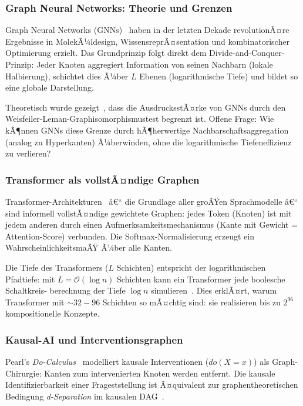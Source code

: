 ﻿\documentclass[12pt,a4paper,twoside]{article}
\theoremstyle{definition}
\theoremstyle{plain}
\theoremstyle{remark}
\begin{document}
\subsubsection{Graph Neural Networks: Theorie und Grenzen}

Graph Neural Networks (GNNs)~\cite{Kipf2017, Velickovic2018}
haben in der letzten Dekade revolutionÃ¤re Ergebnisse in
MolekÃ¼ldesign, WissensreprÃ¤sentation und kombinatorischer
Optimierung erzielt.  Das Grundprinzip folgt direkt dem
Divide-and-Conquer-Prinzip:  Jeder Knoten aggregiert
Information von seinen Nachbarn (lokale Halbierung),
schichtet dies Ã¼ber $L$ Ebenen (logarithmische Tiefe)
und bildet so eine globale Darstellung.

Theoretisch wurde gezeigt~\cite{Xu2019}, dass die
AusdrucksstÃ¤rke von GNNs durch den
Weisfeiler-Leman-Graphisomorphismustest begrenzt ist.
Offene Frage: Wie kÃ¶nnen GNNs diese Grenze durch
hÃ¶herwertige Nachbarschaftsaggregation (analog zu
Hyperkanten) Ã¼berwinden, ohne die logarithmische
Tiefeneffizienz zu verlieren?

\subsubsection{Transformer als vollstÃ¤ndige Graphen}

Transformer-Architekturen~\cite{Vaswani2017} â€“ die Grundlage
aller groÃŸen Sprachmodelle â€“ sind informell vollstÃ¤ndige
gewichtete Graphen: jedes Token (Knoten) ist mit jedem anderen
durch einen Aufmerksamkeitsmechanismus (Kante mit Gewicht =
Attention-Score) verbunden.  Die Softmax-Normalisierung
erzeugt ein WahrscheinlichkeitsmaÃŸ Ã¼ber alle Kanten.

Die Tiefe des Transformers ($L$ Schichten) entspricht der
logarithmischen Pfadtiefe: mit $L = \mathcal{O}(\log n)$
Schichten kann ein Transformer jede boolesche Schaltkreis-
berechnung der Tiefe $\log n$ simulieren~\cite{Perez2021}.
Dies erklÃ¤rt, warum Transformer mit $\sim 32{-}96$ Schichten
so mÃ¤chtig sind: sie realisieren bis zu $2^{96}$
kompositionelle Konzepte.

\subsubsection{Kausal-AI und Interventionsgraphen}

Pearl's \emph{Do-Calculus}~\cite{Pearl2009} modelliert
kausale Interventionen ($do(X=x)$) als Graph-Chirurgie:
Kanten zum intervenierten Knoten werden entfernt.  Die
kausale Identifizierbarkeit einer Frageststellung ist
Ã¤quivalent zur graphentheoretischen Bedingung
\emph{d-Separation} im kausalen DAG~\cite{Verma1988}.
\end{document}
